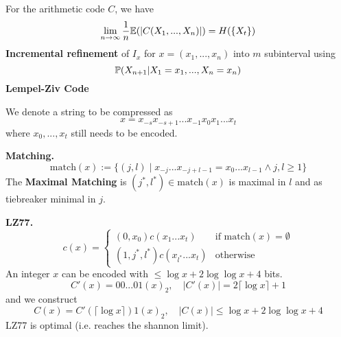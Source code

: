 For the arithmetic code \(C\), we have
\[\lim_{n \to \infty} \frac{1}{n}\E(|C(X_1, ..., X_n)|) = H(\{X_t\})\]
\textbf{Incremental refinement} of \(I_x\) for \(x=(x_1,...,x_n)\) into \(m\) subinterval using 
\[\P(X_{n+1} | X_1 = x_1, ..., X_n = x_n)\] 
\textbf{Lempel-Ziv Code}

We denote a string to be compressed as 
\[x = x_{-s}x_{-s+1}...x_{-1}x_0x_1...x_t\]
where \(x_0, ..., x_t\) still needs to be encoded.

\textbf{Matching.}
\[\text{match}(x) := \{(j, l) \mid x_{-j}...x_{-j+l-1} = x_{0}...x_{l-1} \land j, l \geq 1\}\]
The \textbf{Maximal Matching} is \((j^*, l^*) \in \text{match}(x)\) is maximal in \(l\) and as tiebreaker minimal in \(j\).

\textbf{LZ77.}
\[c(x) = \begin{cases}
    (0, x_0)c(x_1...x_t) & \text{if match}(x) = \emptyset\\
    (1, j^*, l^*)c(x_{l^*}...x_t) & \text{otherwise}
\end{cases}\]
An integer \(x\) can be encoded with \(\leq \log x + 2 \log \log x + 4\) bits.
\[C'(x) = 00...01(x)_2, \quad |C'(x)| = 2 \lceil \log x \rceil + 1\]
and we construct
\[C(x) = C'(\lceil \log x\rceil)1(x)_2, \quad |C(x)| \leq \log x + 2 \log \log x + 4\]
LZ77 is optimal (i.e. reaches the shannon limit).
